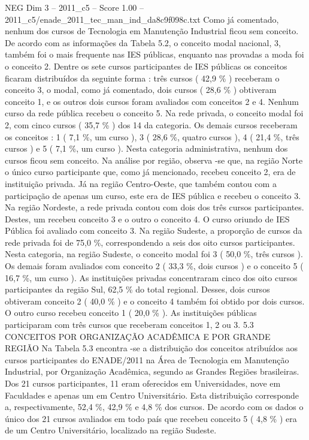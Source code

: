 \begin{textsample}{NEG Dim 3 – 2011\_c5 – Score 1.00 – 2011\_c5/enade\_2011\_tec\_man\_ind\_da8c9f098c.txt}
Como já comentado, nenhum dos cursos de Tecnologia em Manutenção Industrial ficou sem conceito.
De acordo com as informações da Tabela 5.2, o conceito modal nacional, 3, também foi o mais frequente nas IES públicas, enquanto nas provadas a moda foi o conceito 2.
Dentre os sete cursos participantes de IES públicas os conceitos ficaram distribuídos da seguinte forma : três cursos ( 42,9 \% ) receberam o conceito 3, o modal, como já comentado, dois cursos ( 28,6 \% ) obtiveram conceito 1, e os outros dois cursos foram avaliados com conceitos 2 e 4.
Nenhum curso da rede pública recebeu o conceito 5.
Na rede privada, o conceito modal foi 2, com cinco cursos ( 35,7 \% ) dos 14 da categoria.
Os demais cursos receberam os conceitos : 1 ( 7,1 \%, um curso ), 3 ( 28,6 \%, quatro cursos ), 4 ( 21,4 \%, três cursos ) e 5 ( 7,1 \%, um curso ).
Nesta categoria administrativa, nenhum dos cursos ficou sem conceito.
Na análise por região, observa -se que, na região Norte o único curso participante que, como já mencionado, recebeu conceito 2, era de instituição privada.
Já na região Centro-Oeste, que também contou com a participação de apenas um curso, este era de IES pública e recebeu o conceito 3.
Na região Nordeste, a rede privada contou com dois dos três cursos participantes.
Destes, um recebeu conceito 3 e o outro o conceito 4.
O curso oriundo de IES Pública foi avaliado com conceito 3.
Na região Sudeste, a proporção de cursos da rede privada foi de 75,0 \%, correspondendo a seis dos oito cursos participantes.
Nesta categoria, na região Sudeste, o conceito modal foi 3 ( 50,0 \%, três cursos ).
Os demais foram avaliados com conceito 2 ( 33,3 \%, dois cursos ) e o conceito 5 ( 16,7 \%, um curso ).
As instituições privadas concentraram cinco dos oito cursos participantes da região Sul, 62,5 \% do total regional.
Desses, dois cursos obtiveram conceito 2 ( 40,0 \% ) e o conceito 4 também foi obtido por dois cursos.
O outro curso recebeu conceito 1 ( 20,0 \% ).
As instituições públicas participaram com três cursos que receberam conceitos 1, 2 ou 3. 5.3 CONCEITOS POR ORGANIZAÇÃO ACADÊMICA E POR GRANDE REGIÃO Na Tabela 5.3 encontra -se a distribuição dos conceitos atribuídos aos cursos participantes do ENADE/2011 na Área de Tecnologia em Manutenção Industrial, por Organização Acadêmica, segundo as Grandes Regiões brasileiras.
Dos 21 cursos participantes, 11 eram oferecidos em Universidades, nove em Faculdades e apenas um em Centro Universitário.
Esta distribuição corresponde a, respectivamente, 52,4 \%, 42,9 \% e 4,8 \% dos cursos.
De acordo com os dados o único dos 21 cursos avaliados em todo país que recebeu conceito 5 ( 4,8 \% ) era de um Centro Universitário, localizado na região Sudeste.

\end{textsample}
